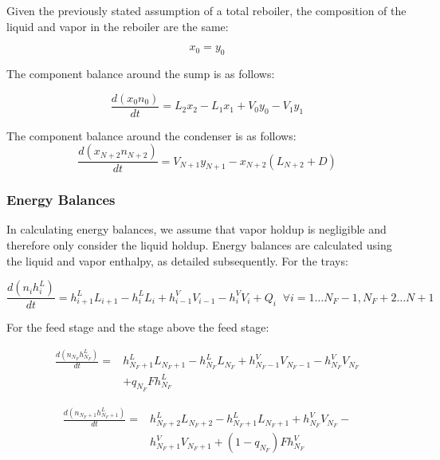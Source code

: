 Given the previously stated assumption of a total reboiler, the composition of the liquid and vapor in the reboiler are the same:

\begin{equation}
    x_0 = y_0
\end{equation}

The component balance around the sump is as follows:

\begin{equation}
    \frac{d(x_{0} n_{0})}{dt} = L_2 x_2 - L_1 x_1 + V_0 y_0 - V_1 y_1
\end{equation}

The component balance around the condenser is as follows:
\begin{equation}
    \frac{d(x_{N+2} n_{N+2})}{dt}  = V_{N+1} y_{N+1} - x_{N+2} (L_{N+2} + D)
\end{equation}

\subsubsection{Energy Balances}\label{sec:energy_balances}

In calculating energy balances, we assume that vapor holdup is negligible and therefore only consider the liquid holdup. Energy balances are calculated using the liquid and vapor enthalpy, as detailed subsequently. For the trays:

\begin{equation}
    \frac{d(n_ih^L_i)}{dt} =  h^L_{i+1}L_{i+1}-h^L_iL_i+h^V_{i-1}V_{i-1}-h^V_iV_i + Q_i  \;\; \forall i=1 \dots N_F-1, N_F+2 \dots N+1
\end{equation}

For the feed stage and the stage above the feed stage:

\begin{equation}
\begin{split}
    \frac{d(n_{N_F}h^L_{N_F})}{dt} = & h^L_{N_F+1}L_{N_F+1}-h^L_{N_F}L_{N_F} + h^V_{N_F-1}V_{N_F-1}-h^V_{N_F}V_{N_F} \\ &  + q_{N_F}F h^L_{N_F}
\end{split}
\end{equation}


\begin{equation}
\begin{split}
    \frac{d(n_{N_F+1}h^L_{N_F+1})}{dt} = & h^L_{N_F+2}L_{N_F+2}-h^L_{N_F+1}L_{N_F+1} +h^V_{N_F} V_{N_F}-\\ &h^V_{N_F+1} V_{N_F+1} + (1-q_{N_F})Fh^V_{N_F}
\end{split}
\end{equation}

